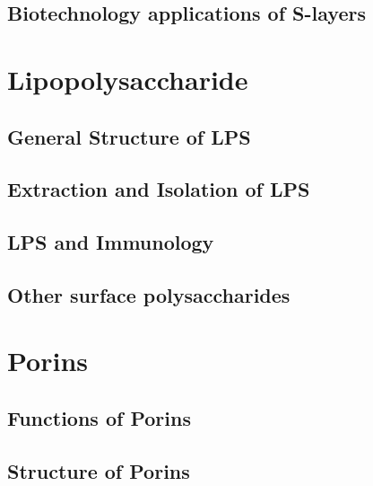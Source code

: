   \subsection{Biotechnology applications of S-layers}\label{sec:biot-appl-s} 
  


  \section{Lipopolysaccharide} \label{sec:intro-lps}
  \subsection{General Structure of LPS}\label{sub:general-structre-lps} 
  \subsection{Extraction and Isolation of LPS} \label{sub:extr-isol-lps}
  \subsection{LPS and Immunology}\label{sub:lps-immuonolgy}
  \subsection{Other surface polysaccharides}\label{sub:other-surf-polysaccharides}
  \section{Porins} \label{sec:intro-porins}   
  \subsection{Functions of Porins}\label{sub:functions-porins}
  \subsection{Structure of Porins}\label{sub:structure-porins}


  

